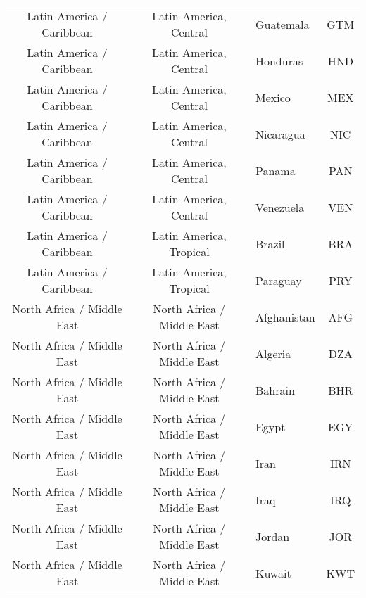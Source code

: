 \begin{landscape}
\begin{longtable}{|c|c|p{5cm}|c|}
     Latin America / Caribbean &       Latin America, Central &                                         Guatemala &  GTM \\
     Latin America / Caribbean &       Latin America, Central &                                          Honduras &  HND \\
     Latin America / Caribbean &       Latin America, Central &                                            Mexico &  MEX \\
     Latin America / Caribbean &       Latin America, Central &                                         Nicaragua &  NIC \\
     Latin America / Caribbean &       Latin America, Central &                                            Panama &  PAN \\
     Latin America / Caribbean &       Latin America, Central &                                         Venezuela &  VEN \\
     Latin America / Caribbean &      Latin America, Tropical &                                            Brazil &  BRA \\
     Latin America / Caribbean &      Latin America, Tropical &                                          Paraguay &  PRY \\
    North Africa / Middle East &   North Africa / Middle East &                                       Afghanistan &  AFG \\
    North Africa / Middle East &   North Africa / Middle East &                                           Algeria &  DZA \\
    North Africa / Middle East &   North Africa / Middle East &                                           Bahrain &  BHR \\
    North Africa / Middle East &   North Africa / Middle East &                                             Egypt &  EGY \\
    North Africa / Middle East &   North Africa / Middle East &                                              Iran &  IRN \\
    North Africa / Middle East &   North Africa / Middle East &                                              Iraq &  IRQ \\
    North Africa / Middle East &   North Africa / Middle East &                                            Jordan &  JOR \\
    North Africa / Middle East &   North Africa / Middle East &                                            Kuwait &  KWT \\

\end{longtable}
\end{landscape}
